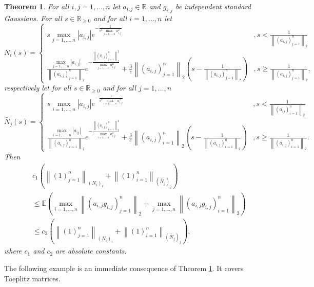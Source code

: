 \documentclass[12pt,a4paper]{article}
\newtheorem{satz}{Theorem}[section]
\newcommand{\R}{\ensuremath{{\mathbb R}}}
\newcommand{\Ex}{\mathbb{E}}
\newcommand{\norm}[1]{\left \lVert#1 \right\rVert}
\begin{document}
\begin{satz}\label{thm:orlicz_darstellung} For all $i,j=1,...,n$ let $a_{i,j}\in\R$ and $g_{i,j}$ be independent standard Gaussians. For all $s\in\R_{\geq 0}$ and for all $i=1,...,n$ let
$$
N_i(s)=
\begin{cases}
	s\max\limits_{j=1,\dots,n}|a_{i,j}|e^{-\frac{1}{s^2\max\limits_{j=1,\dots,n}a_{i,j}^2}} &,s<\frac{1}{\norm{(a_{i,j})_{j=1}^n}_2}\\
	\frac{\max\limits_{j=1,\dots,n}|a_{i,j}|}{\norm{(a_{i,j})_{j=1}^n}_2}e^{-\frac{\norm{(a_{i,j})_{j=1}^n}_2^2}{\max\limits_{j=1,\dots,n}a_{i,j}^2}}+\frac{3}{e}\norm{(a_{i,j})_{j=1}^n}_2\left(s-\frac{1}{\norm{(a_{i,j})_{j=1}^n}_2}\right) &,s\geq\frac{1}{\norm{(a_{i,j})_{j=1}^n}_2},
\end{cases}
$$
respectively let for all $s\in\R_{\geq 0}$ and for all $j=1,...,n$
$$\widetilde{N_j}(s)=
\begin{cases}
	s\max\limits_{i=1,\dots,n}|a_{i,j}|e^{-\frac{1}{s^2\max\limits_{i=1,..\dots,n}a_{i,j}^2}} &,s<\frac{1}{\norm{(a_{ij})_{i=1}^n}_2}\\
	\frac{\max\limits_{i=1,..\dots,n}|a_{ij}|}{\norm{(a_{i,j})_{i=1}^n}_2}e^{-\frac{\norm{(a_{i,j})_{i=1}^n}_2^2}{\max\limits_{i=1,\dots,n}a_{i,j}^2}}+\frac{3}{e}\norm{(a_{i,j})_{i=1}^n}_2\left(s-\frac{1}{\norm{(a_{i,j})_{i=1}^n}_2}\right) &,s\geq\frac{1}{\norm{(a_{i,j})_{i=1}^n}_2}.
\end{cases}
$$
Then 
\begin{eqnarray*}
&&c_{1}\left(\norm{(1)_{j=1}^n}_{(N_i)_i}+\norm{(1)_{i=1}^n}_{(\widetilde{N_j})_j} \right)
\\
&&\leq
\Ex\left(\max\limits_{i=1,...,n}\norm{(a_{i,j}g_{i,j})_{j=1}^n}_2+
\max\limits_{j=1,...,n}\norm{(a_{i,j}g_{i,j})_{i=1}^n}_2\right) \\
&&\leq
c_{2}\left(\norm{(1)_{j=1}^n}_{(N_i)_i}+\norm{(1)_{i=1}^n}_{(\widetilde{N_j})_j}
\right),
\end{eqnarray*}
where $c_1$ and $c_2$ are absolute constants.
\end{satz}
\vskip 3mm

The following example is an immediate consequence of Theorem
\ref{thm:orlicz_darstellung}. It covers Toeplitz matrices.
\end{document}
